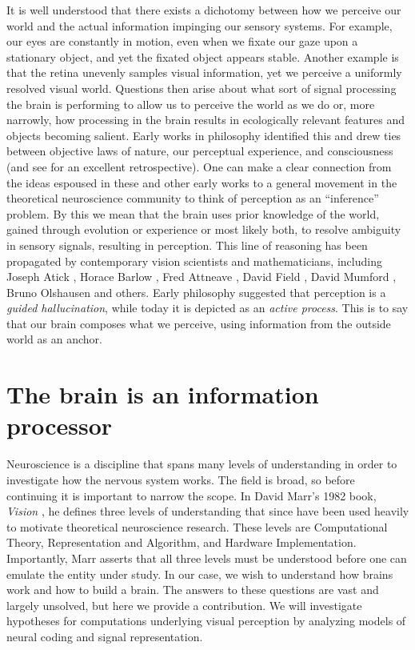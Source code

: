 It is well understood that there exists a dichotomy between how we perceive our world and the actual information impinging our sensory systems. For example, our eyes are constantly in motion, even when we fixate our gaze upon a stationary object, and yet the fixated object appears stable. Another example is that the retina unevenly samples visual information, yet we perceive a uniformly resolved visual world. Questions then arise about what sort of signal processing the brain is performing to allow us to perceive the world as we do or, more narrowly, how processing in the brain results in ecologically relevant features and objects becoming salient. Early works in philosophy identified this and drew ties between objective laws of nature, our perceptual experience, and consciousness \parencite{kant1790critique, helmholtz1878facts} (and see \parencite{westheimer2008helmholtz} for an excellent retrospective). One can make a clear connection from the ideas espoused in these and other early works to a general movement in the theoretical neuroscience community to think of perception as an ``inference'' problem. By this we mean that the brain uses prior knowledge of the world, gained through evolution or experience or most likely both, to resolve ambiguity in sensory signals, resulting in perception. This line of reasoning has been propagated by contemporary vision scientists and mathematicians, including Joseph Atick \citeyearpar{atick1990towards}, Horace Barlow \citeyearpar{barlow2001redundancy}, Fred Attneave \citeyearpar{attneave1954some}, David Field \citeyearpar{field1994goal}, David Mumford \citeyearpar{mumford1994pattern}, Bruno Olshausen \citeyearpar{olshausen2013perception} and others. Early philosophy suggested that perception is a \textit{guided hallucination}, while today it is depicted as an \textit{active process}. This is to say that our brain composes what we perceive, using information from the outside world as an anchor.


\section{The brain is an information processor}
Neuroscience is a discipline that spans many levels of understanding in order to investigate how the nervous system works. The field is broad, so before continuing it is important to narrow the scope. In David Marr's 1982 book, \textit{Vision} \citeyearpar{marr1982vision}, he defines three levels of understanding that since have been used heavily to motivate theoretical neuroscience research. These levels are Computational Theory, Representation and Algorithm, and Hardware Implementation. Importantly, Marr asserts that all three levels must be understood before one can emulate the entity under study. In our case, we wish to understand how brains work and how to build a brain. The answers to these questions are vast and largely unsolved, but here we provide a contribution. We will investigate hypotheses for computations underlying visual perception by analyzing models of neural coding and signal representation.


